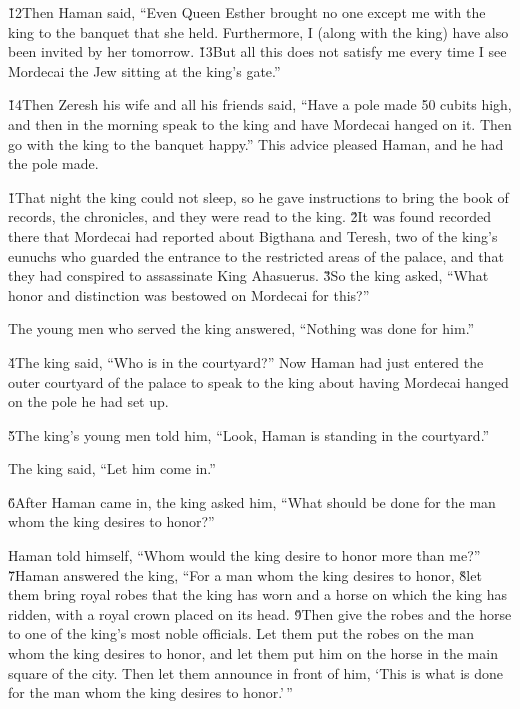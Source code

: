 \v{12}Then Haman said, ``Even Queen Esther brought no one except me with the king to the banquet that she held. Furthermore, I (along with the king) have also been invited by her tomorrow. \v{13}But all this does not satisfy me every time I see Mordecai the Jew sitting at the king's gate.''

\v{14}Then Zeresh his wife and all his friends said, ``Have a pole made 50 cubits high, and then in the morning speak to the king and have Mordecai hanged on it. Then go with the king to the banquet happy.'' This advice pleased Haman, and he had the pole made.

\v{1}That night the king could not sleep, so he gave instructions to bring the book of records, the chronicles, and they were read to the king. \v{2}It was found recorded there that Mordecai had reported about Bigthana and Teresh, two of the king's eunuchs who guarded the entrance to the restricted areas of the palace, and that they had conspired to assassinate King Ahasuerus. \v{3}So the king asked, ``What honor and distinction was bestowed on Mordecai for this?''

The young men who served the king answered, ``Nothing was done for him.''

\v{4}The king said, ``Who is in the courtyard?'' Now Haman had just entered the outer courtyard of the palace to speak to the king about having Mordecai hanged on the pole he had set up.

\v{5}The king's young men told him, ``Look, Haman is standing in the courtyard.''

The king said, ``Let him come in.''

\v{6}After Haman came in, the king asked him, ``What should be done for the man whom the king desires to honor?''

Haman told himself, ``Whom would the king desire to honor more than me?'' \v{7}Haman answered the king, ``For a man whom the king desires to honor, \v{8}let them bring royal robes that the king has worn and a horse on which the king has ridden, with a royal crown placed on its head. \v{9}Then give the robes and the horse to one of the king's most noble officials. Let them put the robes on the man whom the king desires to honor, and let them put him on the horse in the main square of the city. Then let them announce in front of him, `This is what is done for the man whom the king desires to honor.'\,''

